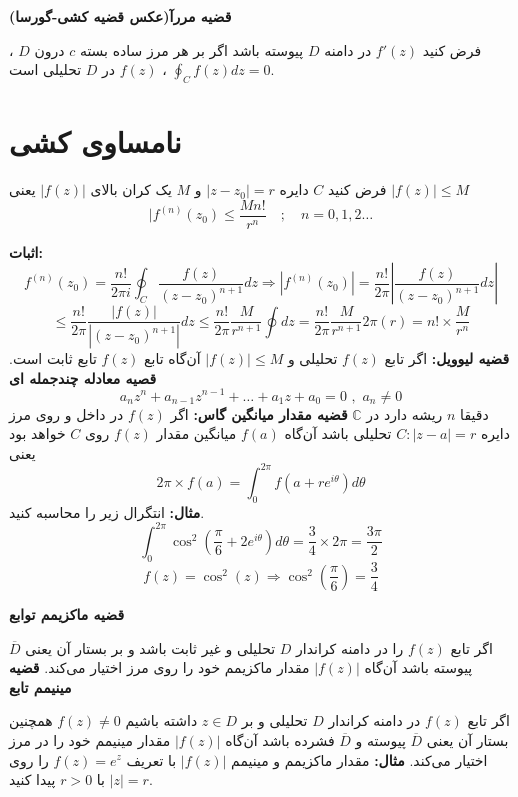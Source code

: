 \documentclass[12pt]{report}
\begin{document}
	\textbf{قضیه  مررآ(عکس قضیه کشی-گورسا)}
	
	فرض کنید
	$f'(z)$
	در دامنه 
	$D$
	پیوسته باشد اگر بر هر مرز ساده بسته 
	$c$
	درون 
	$D$
	،
	$\oint_{C} f(z) dz = 0$
	،
	$f(z)$
	در 
	$D$
	تحلیلی است.
	
	\section{نامساوی کشی}
	فرض کنید
	$C$
	دایره 
	$|z - z_0| = r$
	و 
	$M$
	یک کران بالای 
	$|f(z)|$
	یعنی 
	$|f(z)| \leq M$
	$$|f^{(n)}(z_0) \leq \frac{Mn!}{r^n} \quad ;\quad n = 0, 1,2 \dots $$
	
	\textbf{اثبات:}
	$$f^{(n)}(z_0) =\frac{n!}{2\pi i} \oint_{C} \frac{f(z)}{(z - z_0)^{n+1}}dz \Rightarrow |f^{(n)}(z_0)| =\frac{n!}{2\pi} |\frac{f(z)}{(z - z_0)^{n+1}}dz|$$
	$$\leq\frac{n!}{2\pi} \frac{|f(z)|}{|(z - z_0)^{n+1}|}dz \leq \frac{n!}{2\pi} \frac{M}{r^{n+1}}\oint dz = \frac{n!}{2\pi} \frac{M}{r^{n+1}} 2\pi(r) = n! \times \frac{M}{r^n}$$
	\newline
	\textbf{قضیه لیوویل:}
	اگر تابع
	$f(z)$
	تحلیلی و 
	$|f(z)| \leq M$
	آن‌گاه تابع 
	$f(z)$
	تابع ثابت است.
	\textbf{قصیه معادله چندجمله ای}
	$$a_nz^n + a_{n -1}z ^{n-1} + \dots + a_1z + a_0 = 0 \,\,, \,\,a_n \neq 0$$
	دقیقا 
	$n$
	ریشه دارد در 
	$\mathbb{C}$
	\newline
	\textbf{قضیه مقدار میانگین گاس:}
	اگر 
	$f(z)$
	در داخل و روی مرز دایره
	$C :|z - a| = r$
	تحلیلی باشد آن‌گاه
	$f(a)$
	میانگین مقدار 
	$f(z)$
	روی 
	$C$
	خواهد بود یعنی
	$$2\pi \times f(a) = \int_{0}^{2\pi} f(a + re^{i\theta})d\theta$$
	\newline
	\textbf{مثال:}
	انتگرال زیر را محاسبه کنید.
	$$\int_{0}^{2\pi} \cos^2(\frac{\pi}{6} + 2e^{i\theta})d\theta=\frac{3}{4} \times 2\pi = \frac{3\pi}{2}$$
	$$f(z) = \cos^2(z) \Rightarrow \cos^2(\frac{\pi}{6}) = \frac{3}{4}$$
	
	\textbf{قضیه ماکزیمم توابع}
	
	اگر تابع
	$f(z)$
	را در دامنه کراندار
	$D$
	تحلیلی و غیر ثابت باشد و بر بستار آن یعنی
	$\overline{D}$
	پیوسته باشد آن‌گاه
	$|f(z)|$
	مقدار ماکزیمم خود را روی مرز اختیار می‌کند.
	\newline
	\textbf{قضیه مینیمم تابع}
	
	اگر تابع 
	$f(z)$
	در دامنه کراندار
	$D$
	تحلیلی و بر 
	$z \in D$
	داشته باشیم
	$f(z) \neq 0$
	همچنین بستار آن یعنی
	$\overline{D}$
	پیوسته و 
	$\overline{D}$
	فشرده باشد آن‌گاه
	$|f(z)|$
	مقدار مینیمم خود را در مرز اختیار می‌کند.
	\newline
	\textbf{مثال:}
	مقدار ماکزیمم و مینیمم 
	$|f(z)|$
	با تعریف 
	$f(z) = e^z$
	را روی 
	$|z| = r$
	با 
	$r > 0$
	پیدا کنید.
	
\end{document}

